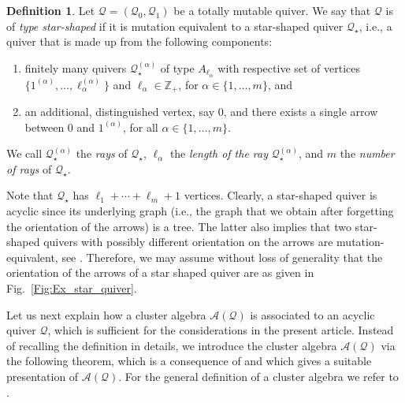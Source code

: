 \documentclass[letter,11pt]{amsart}
\newcommand{\ZZ}{\ensuremath{\mathbb{Z}}}
\newcommand{\cA}{\mathcal{A}}
\newcommand{\cQ}{\mathcal{Q}}
\theoremstyle{theorem}
\theoremstyle{definition}
\newtheorem{defi}[Thm]{Definition} %
\newcommand{\len}{\ell}
\numberwithin{equation}{section}
\begin{document}
\begin{defi}
	\label{Def:star}
	Let $ \cQ = (\cQ_0,\cQ_1) $ be a totally mutable quiver. %
	We say that $ \cQ $ is of {\em type star-shaped} if it is mutation equivalent to a star-shaped quiver $ \cQ_\star $,
	i.e., a quiver that   
	is made up from the following components:
	\begin{enumerate}[(1)]
		\item 
		finitely many quivers $ \cQ^{(\alpha)}_\star $ of type $ A_{\len_\alpha} $ with 
		respective set of vertices $ \{ 1^{(\alpha)}, \ldots, \len_\alpha^{(\alpha)} \} $ 
		and $ \len_\alpha \in \ZZ_+ $, 
		for $ \alpha \in \{ 1, \ldots, m \} $,
		and
		
		\item 
		an additional, distinguished vertex, say $ 0 $, 
		and there exists a single arrow between $ 0 $ and $ 1^{(\alpha)}  $, 
		for all $ \alpha \in \{ 1, \ldots, m \} $. 
	\end{enumerate} 
	We call 
	$ \cQ^{(\alpha)}_\star  $ the {\em rays} of $ \cQ_\star $,
	$ \len_\alpha $ the {\em length of the ray} $ \cQ^{(\alpha)}_\star $,
	and
	$ m $ the {\em number of rays} of $ \cQ_\star $.  
\end{defi}

Note that $ \cQ_\star $ has $ \len_1 + \cdots +  \len_m + 1 $ vertices. 
Clearly, a star-shaped quiver is acyclic
since its underlying graph 
(i.e., the graph that we obtain after forgetting the orientation of the arrows) 
is a tree. 
The latter also implies that two star-shaped quivers with possibly different orientation on the arrows are mutation-equivalent,
see \cite[Lemma~5.1.4]{Marsh13}. 
Therefore, we may assume without loss of generality 
that the orientation of the arrows of a star shaped quiver are as given in Fig.~\ref{Fig:Ex_star_quiver}.


Let us next explain how a cluster algebra $ \cA(\cQ) $ is associated to an acyclic quiver $ \cQ $,
which is sufficient for the considerations in the present article. 
Instead of recalling the definition in details, we introduce the cluster algebra $ \cA(\cQ) $ 
via the following theorem, which is a consequence of \cite[Thm.~1.20 and Cor.~1.21]{BFZ2005} 
and which gives a suitable presentation of $ \cA(\cQ) $.
For the general definition of a cluster algebra we refer to \cite[Section~2]{FZ2002}. 
\end{document}
